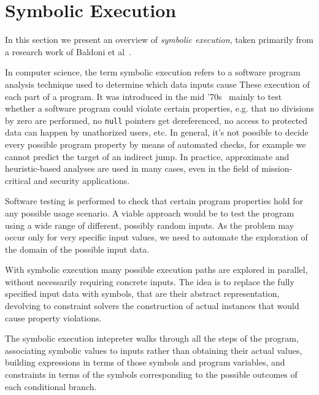 \section{Symbolic Execution}
In this section we present an overview of \textit{symbolic execution}, taken primarily from a research work of Baldoni et al~\cite{Baldoni:2018:SSE:3212709.3182657}.

In computer science, the term symbolic execution refers to a software program analysis technique used to determine which data inputs cause These execution of each part of a program. It was introduced in the mid '70s~\cite{K-ICRS75,SELECT-ICRS75,K-CACM76,H-TSE77} mainly to test whether a software program could violate certain properties, e.g. that no divisions by zero are performed, no \texttt{null} pointers get dereferenced, no access to protected data can happen by unathorized users, etc. In general, it's not possible to decide every possible program property by means of automated checks, for example we cannot predict the target of an indirect jump. %
In practice, approximate and heuristic-based analyses are used in many cases, even in the field of mission-critical and security applications.

Software testing is performed to check that certain program properties hold for any possible usage scenario. A viable approach would be to test the program using a wide range of different, possibly random inputs. As the problem may occur only for very specific input values, we need to automate the exploration of the domain of the possible input data. 

With symbolic execution many possible execution paths are explored in parallel, without necessarily requiring concrete inputs. The idea is to replace the fully specified input data with symbols, that are their abstract representation, devolving to constraint solvers the construction of actual instances that would cause property violations. 

The symbolic execution intepreter walks through all the steps of the program, associating symbolic values to inputs rather than obtaining their actual values, building  expressions in terms of those symbols and program variables, and constraints in terms of the symbols corresponding to the possible outcomes of each conditional branch. 

